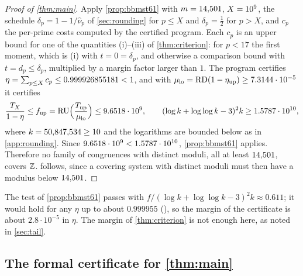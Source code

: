 \begin{table}[ht]
\centering
\caption{Where the budget goes. Certified contributions of the prime ranges for $m=\Mzero$
($P_{\max}=\PmaxMain$) and $m=\MzeroLean$ ($P_{\max}=\Pmax$); the second column gives the number of primes (for the
last two rows, for $m=\Mzero$ and for $m=\MzeroLean$). Every entry is rounded up in the sixth decimal; the totals
are the certified values of $\eta_{\mathrm{up}}$, rounded up.}
\label{tab:budget}
\small

\end{table}

\begin{proof}[Proof of \cref{thm:main}]
Apply \cref{prop:bbmst61} with $m=\Mzero$, $X=10^{9}$, the schedule $\delta_p=1-1/\hat\nu_p$ of \cref{sec:rounding}
for $p\le X$ and $\delta_p=\frac12$ for $p>X$, and $c_p$ the per-prime costs computed by the certified program. Each
$c_p$ is an upper bound for one of the quantities (i)--(iii) of \cref{thm:criterion}: for $p<17$ the first moment,
which is (i) with $t=0=\delta_p$, and otherwise a comparison bound with $t=d_p\le\delta_p$, multiplied by a margin
factor larger than $1$. The program certifies $\eta=\sum_{p\le X}c_p\le0.999926855181<1$, and with
$\mu_{\mathrm{lo}}=\mathrm{RD}(1-\eta_{\mathrm{up}})\ge7.3144\cdot 10^{-5}$ it certifies
\[
  \frac{T_X}{1-\eta}\le f_{\mathrm{up}}=\mathrm{RU}\Bigl(\frac{T_{\mathrm{up}}}{\mu_{\mathrm{lo}}}\Bigr)\le9.6518\cdot 10^{9},
  \qquad
  (\log k+\log\log k-3)^2k\ge1.5787\cdot 10^{10},
\]
where $k=50{,}847{,}534\ge10$ and the logarithms are bounded below as in \cref{app:rounding}. Since
$9.6518\cdot 10^{9}<1.5787\cdot 10^{10}$, \cref{prop:bbmst61} applies. Therefore no family of congruences with distinct moduli, all at
least $14{,}501$, covers $\mathbb{Z}$.  follows, since a covering system with distinct moduli must then have a
modulus below $14{,}501$.
\end{proof}

The test of \cref{prop:bbmst61} passes with $f/(\log k+\log\log k-3)^2k\approx0.611$; it would hold for any
$\eta$ up to about $0.999955$ (), so the margin of the certificate is
about $2.8\cdot10^{-5}$ in $\eta$. The margin of \cref{thm:criterion} is not enough here, as noted in \cref{sec:tail}.

\subsection{The formal certificate for \cref{thm:main}}\label{sec:certified-formal}

